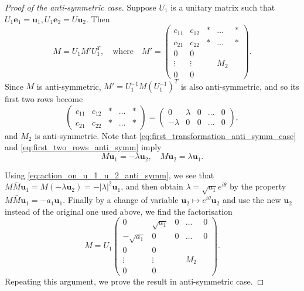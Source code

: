 \documentclass[11pt, a4paper]{article}
\numberwithin{equation}{section}
\renewcommand{\vec}[1]{\mathbf{#1}}
\theoremstyle{definition}
\theoremstyle{remark}
\begin{document}
\begin{proof}[Proof of the anti-symmetric case]
  Suppose $U_1$ is a unitary matrix such that $U_1 \vec{e}_1 = \vec{u}_1, U_1 \vec{e}_2 = U \vec{u}_2$. Then
  \begin{equation} \label{eq:first_transformation_anti_symm_case}
    M = U_1 M' U^T_1, \quad \text{where} \quad M' =
    \begin{pmatrix}
      c_{11} & c_{12} & * & \dots & * \\
      c_{21} & c_{22} & * & \dots & * \\
      0 & 0 & & & \\
      \vdots & \vdots & & M_2 & \\
      0 & 0 & & &
    \end{pmatrix}.
  \end{equation}
  Since $M$ is anti-symmetric, $M' = U^{-1}_1 M (U^{-1}_1)^T$ is also anti-symmetric, and so its first two rows become
  \begin{equation} \label{eq:first_two_rows_anti_symm}
    \begin{pmatrix}
      c_{11} & c_{12} & * & \dots & * \\
      c_{21} & c_{22} & * & \dots & *
    \end{pmatrix}
    = 
    \begin{pmatrix}
      0 & \lambda & 0 & \dots & 0 \\
      -\lambda & 0 & 0 & \dots & 0 
    \end{pmatrix},
  \end{equation}
  and $M_2$ is anti-symmetric. Note that \eqref{eq:first_transformation_anti_symm_case} and \eqref{eq:first_two_rows_anti_symm} imply
  \begin{equation} \label{eq:action_on_u_1_u_2_anti_symm}
    M \bar{\vec{u}}_1 = -\lambda \vec{u}_2, \quad M \bar{\vec{u}}_2 = \lambda \vec{u}_1.
  \end{equation}

  Using \eqref{eq:action_on_u_1_u_2_anti_symm}, we see that $M \bar{M} \vec{u}_1 = M(-\lambda \vec{u}_2) = - \lvert \lambda \rvert^2 \vec{u}_1$, and then obtain $\lambda = \sqrt{a_1} e^{i\theta}$ by the property $M \bar{M} \vec{u}_1 = -a_1 \vec{u}_1$. Finally by a change of variable $\vec{u}_2 \mapsto e^{i\theta} \vec{u}_2$ and use the new $\vec{u}_2$ instead of the original one used above, we find the factorisation
  \begin{equation}
    M = U_1 
    \begin{pmatrix}
      0 & \sqrt{a_1} & 0 & \dots & 0 \\
      -\sqrt{a_1} & 0 & 0 & \dots & 0 \\
      0 & 0 & & & \\
      \vdots & \vdots & & M_2 & \\
      0 & 0 & & &
    \end{pmatrix}.
  \end{equation}
  Repeating this argument, we prove the result in anti-symmetric case.
\end{proof}
\end{document}
